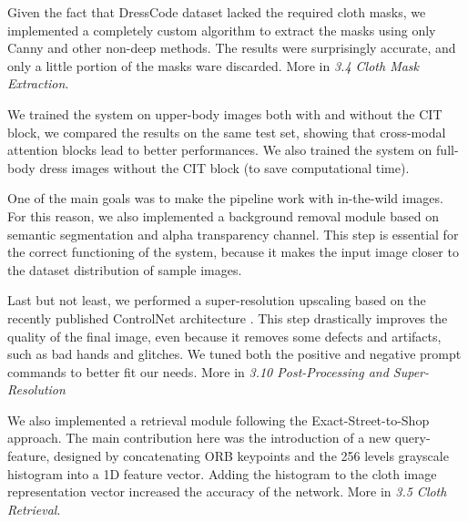 Given the fact that DressCode dataset lacked the required cloth masks, we implemented a completely custom algorithm to extract the masks using only Canny and other non-deep methods. The results were surprisingly accurate, and only a little portion of the masks ware discarded. More in \textit{3.4 Cloth Mask Extraction}.

We trained the system on upper-body images both with and without the CIT block, we compared the results on the same test set, showing that cross-modal attention blocks lead to better performances. 
We also trained the system on full-body dress images without the CIT block (to save computational time). 

One of the main goals was to make the pipeline work with in-the-wild images. For this reason, we also implemented a background removal module based on semantic segmentation and alpha transparency channel. This step is essential for the correct functioning of the system, because it makes the input image closer to the dataset distribution of sample images.

Last but not least, we performed a super-resolution upscaling based on the recently published ControlNet architecture \cite{controlnet}. This step drastically improves the quality of the final image, even because it removes some defects and artifacts, such as bad hands and glitches. We tuned both the positive and negative prompt commands  to better fit our needs. More in \textit{3.10 Post-Processing and Super-Resolution}

We also implemented a retrieval module following the Exact-Street-to-Shop \cite{stree2shop} approach. The main contribution here was the introduction of a new query-feature, designed by concatenating ORB keypoints and the 256 levels grayscale histogram into a 1D feature vector. Adding the histogram to the cloth image representation vector increased the accuracy of the network. More in \textit{3.5 Cloth Retrieval}.

\hfill



